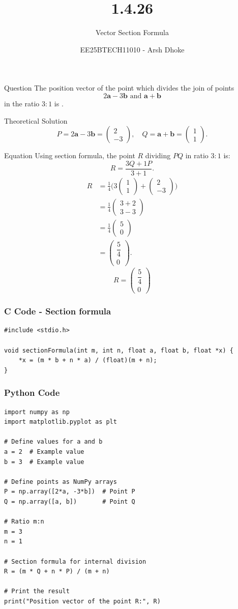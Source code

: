 \documentclass{beamer}
\title{1.4.26}
\subtitle{Vector Section Formula}
\author{EE25BTECH11010 - Arsh Dhoke}
\date{}
\newcommand{\brak}[1]{\begin{pmatrix}#1\end{pmatrix}}
\begin{document}
\begin{frame}
\titlepage
\end{frame}

\begin{frame}{Question}
The position vector of the point which divides the join of points 
\[
2\mathbf{a} - 3\mathbf{b} \text{ and } \mathbf{a} + \mathbf{b}
\]
in the ratio \( 3:1 \) is \underline{\hspace{2cm}}.
\end{frame}

\begin{frame}{Theoretical Solution}
\[
P = 2\mathbf a - 3\mathbf b = \brak{2\\-3}, \quad 
Q = \mathbf a + \mathbf b = \brak{1\\1}.
\]
\end{frame}

\begin{frame}{Equation}
Using section formula,
the point \(R\) dividing \(PQ\) in ratio \(3:1\) is:
\[
R=\frac{3Q+1P}{3+1}.
\]
\begin{align*}
R &= \frac{1}{4}\Big(3\brak{1\\1}+\brak{2\\-3}\Big) \\
  &= \frac{1}{4}\brak{3+2\\3-3} \\
  &= \frac{1}{4}\brak{5\\0} \\
  &= \brak{\dfrac{5}{4}\\0}.
\end{align*}
\[
\boxed{R=\brak{\dfrac{5}{4}\\0}}
\]
\end{frame}

\begin{frame}[fragile]
    \frametitle{C Code - Section formula}

    \begin{lstlisting}
#include <stdio.h>

void sectionFormula(int m, int n, float a, float b, float *x) {
    *x = (m * b + n * a) / (float)(m + n);
}

    \end{lstlisting}
\end{frame}

\begin{frame}[fragile]
    \frametitle{Python Code}

    \begin{lstlisting}
import numpy as np
import matplotlib.pyplot as plt

# Define values for a and b
a = 2  # Example value
b = 3  # Example value

# Define points as NumPy arrays
P = np.array([2*a, -3*b])  # Point P
Q = np.array([a, b])       # Point Q

# Ratio m:n
m = 3
n = 1

# Section formula for internal division
R = (m * Q + n * P) / (m + n)

# Print the result
print("Position vector of the point R:", R)

    \end{lstlisting}
\end{frame}
\end{document}
